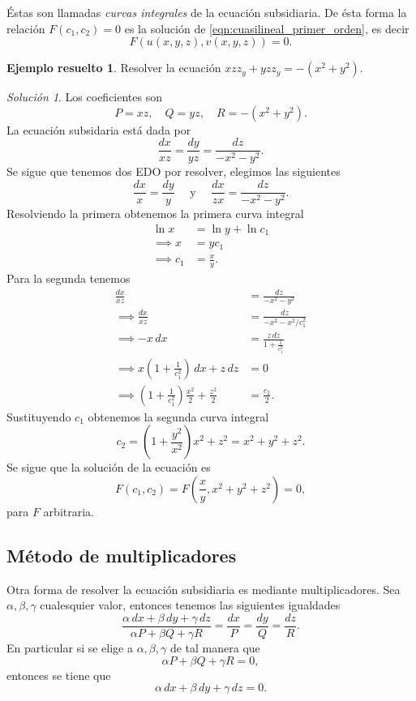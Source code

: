 \documentclass[11pt,letterpaper,draft]{report}
\theoremstyle{plain}
\theoremstyle{definition}
\newtheorem{solved}[theorem]{Ejemplo resuelto}
\theoremstyle{remark}
\newtheorem*{solution}{Solución}
\newcommand\<{\langle}
\renewcommand\>{\rangle}
\begin{document}
Éstas son llamadas \textit{curvas integrales} de la ecuación
subsidiaria. De ésta forma la relación $F(c_1,c_2) = 0$ es
la solución
de \ref{eqn:cuasilineal_primer_orden}, es decir
\[
F(u(x,y,z), v(x,y,z))=0.
\] 
\begin{solved}
  Resolver la ecuación $xz z_y + yz z_y = -(x^2+y^2)$.
  \begin{solution}
    Los coeficientes son
    \[
    P = xz, \quad Q = yz, \quad R = -(x^2+y^2).
    \] 
    La ecuación subsidaria está dada por
    \[
    \frac{dx}{xz} = \frac{dy}{yz} = \frac{dz}{-x^2-y^2}.
    \] 
    Se sigue que tenemos dos EDO por resolver, elegimos las
    siguientes
    \[
    \frac{dx}{x} = \frac{dy}{y} \quad \text{ y } \quad
    \frac{dx}{zx} = \frac{dz}{-x^2-y^2}.
    \] 
    Resolviendo la primera obtenemos la primera curva
    integral
    \begin{align*}
      \ln x &= \ln y + \ln c_1\\
      \implies x &= yc_1\\
      \implies c_1 &= \frac{x}{y}.
    \end{align*}
    Para la segunda tenemos
    \begin{align*}
      \frac{dx}{xz} &= \frac{dz}{-x^2-y^2}\\
      \implies \frac{dx}{xz} &= \frac{dz}{-x^2-x^2 / c_1^2}\\
      \implies -x \, dx &= \frac{z \, dz}{1 + \frac{1}{c_1^2}}\\
      \implies x\left(1+\frac{1}{c_1^2}\right) \, dx + z \, dz &= 0\\
      \implies \left(1+\frac{1}{c_1^2}\right) \frac{x^2}{2} +
      \frac{z^2}{2} &= \frac{c_2}{2}.
    \end{align*}
    Sustituyendo $c_1$ obtenemos la segunda curva integral
    \[
    c_2 = \left(1+\frac{y^2}{x^2}\right) x^2 + z^2 = x^2 +
    y^2 + z^2.
    \] 
    Se sigue que la solución de la ecuación es
    \[
    F(c_1,c_2) = F\left(\frac{x}{y}, x^2+y^2+z^2\right) = 0,
    \] 
    para $F$ arbitraria.
  \end{solution}
\end{solved}

\subsection{Método de multiplicadores}

Otra forma de resolver la ecuación subsidiaria es mediante
multiplicadores. Sea $\alpha, \beta, \gamma$ cualesquier
valor, entonces tenemos las siguientes igualdades
\[
\frac{\alpha \, dx + \beta \, dy + \gamma \, dz}{\alpha P +
\beta Q + \gamma R} = \frac{dx}{P} = \frac{dy}{Q} =
\frac{dz}{R}.
\] 
En particular si se elige a $\alpha, \beta, \gamma$ de tal
manera que
\[
\alpha P + \beta Q + \gamma R = 0,
\] 
entonces se tiene que
\[
\alpha \, dx + \beta \, dy + \gamma \, dz = 0.
\] 
\end{document}
